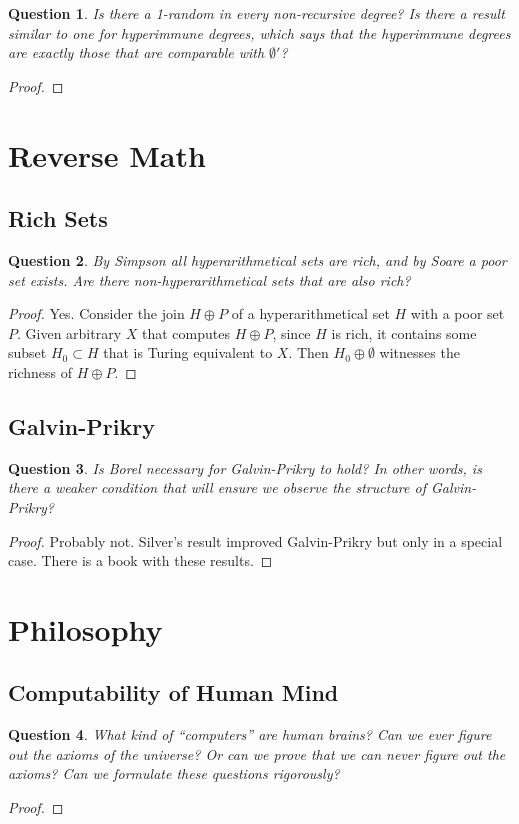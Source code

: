 \documentclass{article}
\newtheorem{question}{Question}[subsection]
\begin{document}
    \begin{question}
      Is there a 1-random in every non-recursive degree? Is there a result
      similar to one for hyperimmune degrees, which says that the
      hyperimmune degrees are exactly those that are comparable with
      $\emptyset'$?
    \end{question}
    \begin{proof}
    \end{proof}

\section{Reverse Math}
  \subsection{Rich Sets}
    \begin{question}
      By Simpson all hyperarithmetical sets are rich, and by Soare a
      poor set exists. Are there non-hyperarithmetical sets that are also
      rich?
    \end{question}
    \begin{proof}
      Yes. Consider the join $H\oplus P$ of a hyperarithmetical set $H$
      with a poor set $P$. Given arbitrary $X$ that computes $H\oplus P$,
      since $H$ is rich, it contains some subset $H_0\subset H$ that is
      Turing equivalent to $X$. Then $H_0\oplus\emptyset$ witnesses the
      richness of $H\oplus P$.
    \end{proof}

  \subsection{Galvin-Prikry}
    \begin{question}
      Is Borel necessary for Galvin-Prikry to hold? In other words, is
      there a weaker condition that will ensure we observe the structure of
      Galvin-Prikry?
    \end{question}
    \begin{proof}
      Probably not. Silver's result improved Galvin-Prikry but only in a
      special case. There is a book with these results.
    \end{proof}

\section{Philosophy}
  \subsection{Computability of Human Mind}
    \begin{question}
      What kind of ``computers'' are human brains? Can we ever figure out
      the axioms of the universe? Or can we prove that we can never figure
      out the axioms? Can we formulate these questions rigorously?
    \end{question}
    \begin{proof}
    \end{proof}
\end{document}
